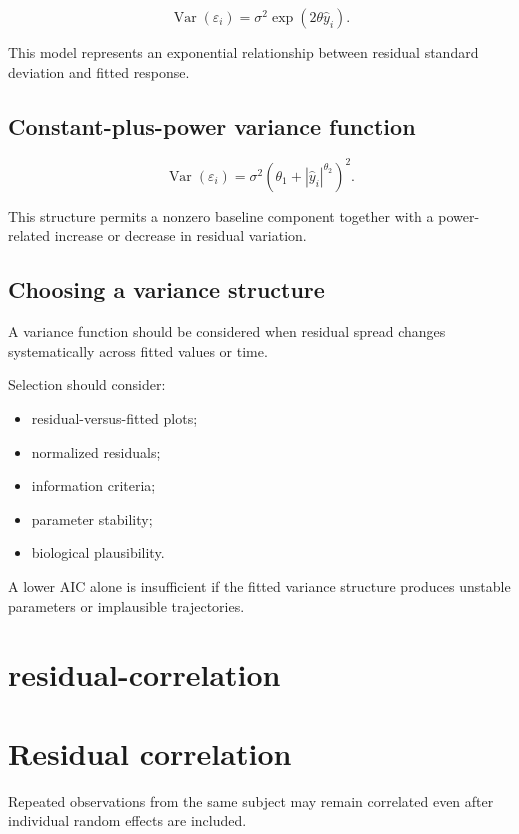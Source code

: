 \documentclass[
  english,
  letterpaper,
  DIV=11,
  numbers=noendperiod]{scrreprt}
\providecommand{\tightlist}{%
  \setlength{\itemsep}{0pt}\setlength{\parskip}{0pt}}
\begin{document}
\[
\operatorname{Var}(\varepsilon_i)
=
\sigma^2 \exp(2\theta\hat y_i).
\]

This model represents an exponential relationship between residual
standard deviation and fitted response.

\section{Constant-plus-power variance
function}\label{constant-plus-power-variance-function}

\[
\operatorname{Var}(\varepsilon_i)
=
\sigma^2
\left(
\theta_1 + |\hat y_i|^{\theta_2}
\right)^2.
\]

This structure permits a nonzero baseline component together with a
power-related increase or decrease in residual variation.

\section{Choosing a variance
structure}\label{choosing-a-variance-structure}

A variance function should be considered when residual spread changes
systematically across fitted values or time.

Selection should consider:

\begin{itemize}
\tightlist
\item
  residual-versus-fitted plots;
\item
  normalized residuals;
\item
  information criteria;
\item
  parameter stability;
\item
  biological plausibility.
\end{itemize}

A lower AIC alone is insufficient if the fitted variance structure
produces unstable parameters or implausible trajectories.

\chapter{residual-correlation}\label{residual-correlation}

\chapter{Residual correlation}\label{residual-correlation-1}

Repeated observations from the same subject may remain correlated even
after individual random effects are included.
\end{document}
